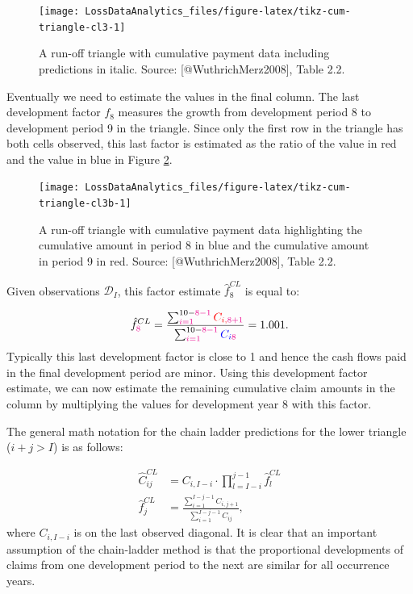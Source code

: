 \documentclass[]{book}
\begin{document}
\begin{figure}

{\centering \texttt{[image: LossDataAnalytics\_files/figure-latex/tikz-cum-triangle-cl3-1]} 

}

\caption{A run-off triangle with cumulative payment data including predictions in italic. Source: [@WuthrichMerz2008], Table 2.2.}\label{fig:tikz-cum-triangle-cl3}
\end{figure}

Eventually we need to estimate the values in the final column. The last
development factor \(f_8\) measures the growth from development period 8
to development period 9 in the triangle. Since only the first row in the
triangle has both cells observed, this last factor is estimated as the
ratio of the value in red and the value in blue in Figure
\ref{fig:tikz-cum-triangle-cl3b}.

\begin{figure}

{\centering \texttt{[image: LossDataAnalytics\_files/figure-latex/tikz-cum-triangle-cl3b-1]} 

}

\caption{A run-off triangle with cumulative payment data highlighting the cumulative amount in period 8 in blue and the cumulative amount in period 9 in red. Source: [@WuthrichMerz2008], Table 2.2.}\label{fig:tikz-cum-triangle-cl3b}
\end{figure}

Given observations \(\mathcal{D}_I\), this factor estimate
\(\hat{f}^{CL}_{8}\) is equal to:

\[
\hat{f}^{CL}_{\color{magenta}{8}} = \frac{\sum_{i=1}^{10-\color{magenta}{8}-1} \color{red}{C_{i,\color{magenta}{8}+1}}}{\sum_{i=1}^{10-\color{magenta}{8}-1} \color{blue}{C_{i\color{magenta}{8}}}}=1.001.
\] Typically this last development factor is close to 1 and hence the
cash flows paid in the final development period are minor. Using this
development factor estimate, we can now estimate the remaining
cumulative claim amounts in the column by multiplying the values for
development year 8 with this factor.

The general math notation for the chain ladder predictions for the lower
triangle (\(i+j>I\)) is as follows:

\[
\begin{array}{rl}
\hat{C}_{ij}^{CL} &= C_{i,I-i} \cdot \prod_{l=I-i}^{j-1} \hat{f}_l^{CL} \\
\hat{f}_j^{CL} &= \frac{\sum_{i=1}^{I-j-1} C_{i,j+1}}{\sum_{i=1}^{I-j-1} C_{ij}},
\end{array}
\] where \(C_{i,I-i}\) is on the last observed diagonal. It is clear
that an important assumption of the chain-ladder method is that the
proportional developments of claims from one development period to the
next are similar for all occurrence years.
\end{document}
